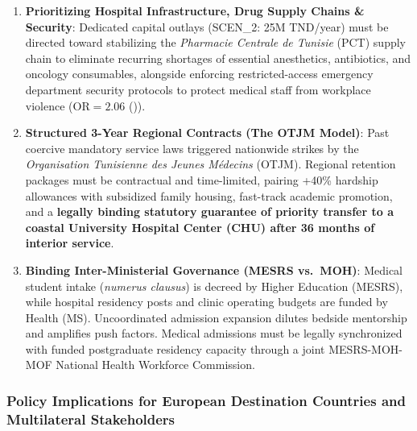 \documentclass[
  11pt,
  a4paper]{article}
\providecommand{\tightlist}{%
  \setlength{\itemsep}{0pt}\setlength{\parskip}{0pt}}
\begin{document}
\begin{enumerate}
  \begin{itemize}
  \tightlist
  \item
    Substantial re-evaluation of on-call and night-duty allowances
    (\emph{indemnités de garde et d'astreinte}) for frontline emergency,
    surgical, and ICU resident staff.
  \item
    Performance- and specialty-based technical bonuses (\emph{primes de
    technicité et de rendement}) targeting critical-shortage
    disciplines.
  \item
    Targeted customs and tax exemptions (\emph{détaxe à l'importation})
    on specialized medical equipment for returning diaspora clinicians.
  \end{itemize}
\item
  \textbf{Prioritizing Hospital Infrastructure, Drug Supply Chains \&
  Security}: Dedicated capital outlays (SCEN\_2: 25M TND/year) must be
  directed toward stabilizing the \emph{Pharmacie Centrale de Tunisie}
  (PCT) supply chain to eliminate recurring shortages of essential
  anesthetics, antibiotics, and oncology consumables, alongside
  enforcing restricted-access emergency department security protocols to
  protect medical staff from workplace violence (\(\text{OR} = 2.06\)
  ()).
\item
  \textbf{Structured 3-Year Regional Contracts (The OTJM Model)}: Past
  coercive mandatory service laws triggered nationwide strikes by the
  \emph{Organisation Tunisienne des Jeunes Médecins} (OTJM). Regional
  retention packages must be contractual and time-limited, pairing +40\%
  hardship allowances with subsidized family housing, fast-track
  academic promotion, and a \textbf{legally binding statutory guarantee
  of priority transfer to a coastal University Hospital Center (CHU)
  after 36 months of interior service}.
\item
  \textbf{Binding Inter-Ministerial Governance (MESRS vs.~MOH)}: Medical
  student intake (\emph{numerus clausus}) is decreed by Higher Education
  (MESRS), while hospital residency posts and clinic operating budgets
  are funded by Health (MS). Uncoordinated admission expansion dilutes
  bedside mentorship and amplifies push factors. Medical admissions must
  be legally synchronized with funded postgraduate residency capacity
  through a joint MESRS-MOH-MOF National Health Workforce Commission.
\end{enumerate}

\subsubsection{Policy Implications for European Destination Countries
and Multilateral
Stakeholders}\label{policy-implications-for-european-destination-countries-and-multilateral-stakeholders}
\end{document}

